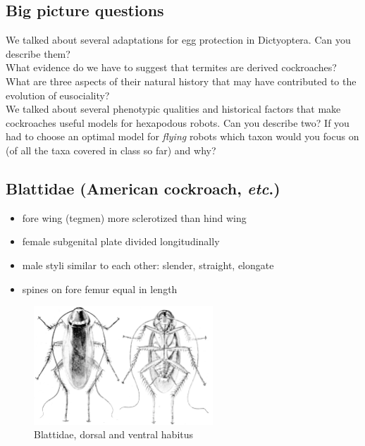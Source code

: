 \documentclass[letterpaper, 11pt]{article}
\begin{document}
\subsection*{Big picture questions}
We talked about several adaptations for egg protection in Dictyoptera. Can you describe them? \\

\noindent{}What evidence do we have to suggest that termites are derived cockroaches? What are three aspects of their natural history that may have contributed to the evolution of eusociality?\\

\noindent{}We talked about several phenotypic qualities and historical factors that make cockroaches useful models for hexapodous robots. Can you describe two? If you had to choose an optimal model for \textit{flying} robots which taxon would you focus on (of all the taxa covered in class so far) and why?

\subsection{Blattidae (American cockroach, \textit{etc}.)}
\begin{itemize}
\item fore wing (tegmen) more sclerotized than hind wing
\item female subgenital plate divided longitudinally
\item male styli similar to each other: slender, straight, elongate
\item spines on fore femur equal in length
\end{itemize}

\begin{figure}[ht!]
  \centering
    \includegraphics[width=0.6\textwidth]{BlattidHabitus}
  \caption{Blattidae, dorsal and ventral habitus \citep[][Fig. 1]{bhl129194}}
  \label{fig:blattid1}
\end{figure}
\end{document}
